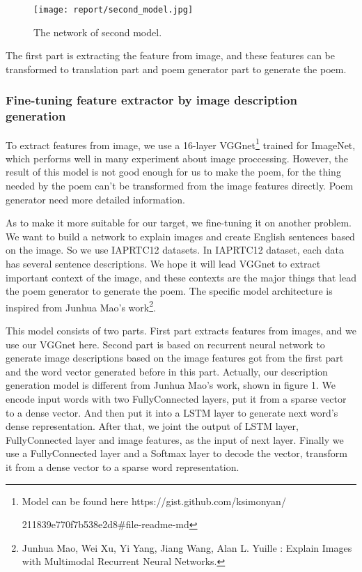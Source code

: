 \documentclass[10pt,twocolumn,letterpaper]{article}
\begin{document}
\begin{figure*}
\begin{center}
\texttt{[image: report/second\_model.jpg]}
\end{center}
   \caption{The network of second model.}
\label{fig:second_layer_network}
\end{figure*}

The first part is extracting the feature from image, and these features can be transformed to translation part and poem generator part to generate the poem.


\subsubsection{Fine-tuning feature extractor by image description generation}


To extract features from image, we use a 16-layer VGGnet\footnote{Model can be found here https://gist.github.com/ksimonyan/

211839e770f7b538e2d8\#file-readme-md} trained for ImageNet, which performs well in many experiment about image proccessing. However, the result of this model is not good enough for us to make the poem, for the thing needed by the poem can’t be transformed from the image features directly. Poem generator need more detailed information.

As to make it more suitable for our target, we fine-tuning it on another problem. We want to build a network to explain images and create English sentences based on the image. So we use IAPRTC12 datasets. In IAPRTC12 dataset, each data has several sentence descriptions. We hope it will lead VGGnet to extract important context of the image, and these contexts are the major things that lead the poem generator to generate the poem. The specific model architecture is inspired from Junhua Mao’s work\footnote{Junhua Mao, Wei Xu, Yi Yang, Jiang Wang, Alan L. Yuille : Explain Images with Multimodal Recurrent Neural Networks.}.

This model consists of two parts. First part extracts features from images, and we use our VGGnet here. Second part is based on recurrent neural network to generate image descriptions based on the image features got from the first part and the word vector generated before in this part. Actually, our description generation model is different from Junhua Mao’s work, shown in figure 1. We encode input words with two FullyConnected layers, put it from a sparse vector to a dense vector. And then put it into a LSTM layer to generate next word’s dense representation. After that, we joint the output of LSTM layer, FullyConnected layer and image features, as the input of next layer. Finally we use a FullyConnected layer and a Softmax layer to decode the vector, transform it from a dense vector to a sparse word representation.
\end{document}
